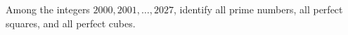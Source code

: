 Among the integers $2000,2001,\ldots,2027$, identify all prime numbers, all perfect squares, and all perfect cubes.

